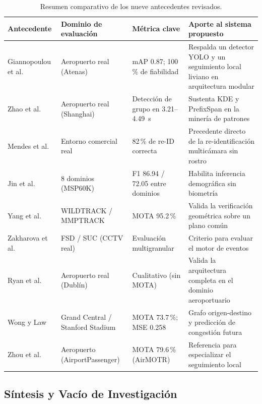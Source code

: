 \documentclass[12pt,letterpaper]{article}
\begin{document}
\begin{table}[t]
\centering
\caption{Resumen comparativo de los nueve antecedentes revisados.}
\label{tab:antecedentes}
\begin{tabular}{@{}p{3.2cm}p{2.8cm}p{3cm}p{6.5cm}@{}}
\toprule
\textbf{Antecedente} & \textbf{Dominio de evaluación} & \textbf{Métrica clave} & \textbf{Aporte al sistema propuesto} \\
\midrule
Giannopoulou et al.~\cite{giannopoulou2026} & Aeropuerto real (Atenas) & mAP 0.87; 100\,\% de fiabilidad & Respalda un detector YOLO y un seguimiento local liviano en arquitectura modular \\
Zhao et al.~\cite{zhao2023} & Aeropuerto real (Shanghai) & Detección de grupo en 3.21--4.49~s & Sustenta KDE y PrefixSpan en la minería de patrones \\
Mendes et al.~\cite{mendes2023} & Entorno comercial real & 82\,\% de re-ID correcta & Precedente directo de la re-identificación multicámara sin rostro \\
Jin et al.~\cite{jin2024} & 8 dominios (MSP60K) & F1 86.94 / 72.05 entre dominios & Habilita inferencia demográfica sin biometría \\
Yang et al.~\cite{yang2023} & WILDTRACK / MMPTRACK & MOTA 95.2\,\% & Valida la verificación geométrica sobre un plano común \\
Zakharova et al.~\cite{zakharova2026} & FSD / SUC (CCTV real) & Evaluación multigranular & Criterio para evaluar el motor de eventos \\
Ryan et al.~\cite{ryan2023} & Aeropuerto real (Dublín) & Cualitativo (sin MOTA) & Valida la arquitectura completa en el dominio aeroportuario \\
Wong y Law~\cite{wonglaw2023} & Grand Central / Stanford Stadium & MOTA 73.7\,\%; MSE 0.258 & Grafo origen-destino y predicción de congestión futura \\
Zhou et al.~\cite{zhou2026} & Aeropuerto (AirportPassenger) & MOTA 79.6\,\% (AirMOTR) & Referencia para especializar el seguimiento local \\
\bottomrule
\end{tabular}
\end{table}

\FloatBarrier

\subsection{Síntesis y Vacío de Investigación}
\end{document}
